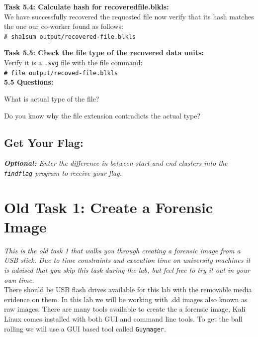 \documentclass[a4paper,11pt]{article}
\begin{document}
{\noindent
\textbf{Task 5.4: Calculate hash for recoveredfile.blkls:}\\
We have successfully recovered the requested file now verify that its hash matches the one our co-worker found as follows: \\

\noindent
\verb|# sha1sum output/recovered-file.blkls|
}\\

{\noindent
\textbf{Task 5.5: Check the file type of the recovered data units:}\\
Verify it is a \texttt{.svg} file with the file command:\\

\noindent
\verb|# file output/recoved-file.blkls|\\

\noindent
\textbf{5.5 Questions:}
\begin{enumerate*}
	\item What is actual type of the file?
	\item Do you know why the file extension contradicts the actual type?\\
\end{enumerate*}	
}
\subsection*{Get Your Flag:}
\noindent
\textit{\textbf{Optional:} Enter the difference in between start and end clusters into the \texttt{findflag} program to receive your flag.}


\section{Old Task 1: Create a Forensic Image}\label{sec:task1-forensic-image}

\textit{This is the old task 1 that walks you through creating a forensic image from a USB stick. Due to time constraints and execution time on university machines it is advised that you skip this task during the lab, but feel free to try it out in your own time.}\\



There should be USB flash drives available for this lab with the removable media evidence on them.  In this lab we will be working with .dd images also known as raw images. There are many tools available to create the a forensic image, Kali Linux comes installed with both GUI and command line tools. To get the ball rolling we will use a GUI based tool called \texttt{Guymager}.\\
\end{document}
